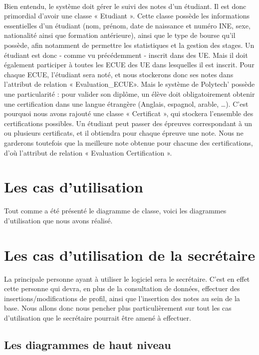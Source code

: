 \documentclass[letter, 11pt] {article}
\begin{document}
	\paragraph{ }	Bien entendu, le système doit gérer le suivi des notes d’un étudiant. Il est donc primordial d'avoir une classe « Etudiant ». Cette classe possède les informations essentielles d’un étudiant (nom, prénom, date de naissance et numéro INE, sexe, nationalité ainsi que formation antérieure), ainsi que le type de bourse qu’il possède, afin notamment de permettre les statistiques et la gestion des stages. Un étudiant est donc - comme vu précédemment - inscrit dans des UE. Mais il doit également participer à toutes les ECUE des UE dans lesquelles il est inscrit. Pour chaque ECUE, l’étudiant sera noté, et nous stockerons donc ses notes dans l'attribut de relation « Evaluation\_ECUE». Mais le système de Polytech’ possède une particularité : pour valider son diplôme, un élève doit obligatoirement obtenir une certification dans une langue étrangère (Anglais, espagnol, arable, …). C’est pourquoi nous avons rajouté une classe « Certificat », qui stockera l’ensemble des certifications possibles. Un étudiant peut passer des épreuves correspondant à un ou plusieurs certificats, et il obtiendra pour chaque épreuve une note. Nous ne garderons toutefois que la meilleure note obtenue pour chacune des certifications, d’où l’attribut de relation « Evaluation Certification ».
	
	\section{Les cas d'utilisation}
	
	Tout comme a été présenté le diagramme de classe, voici les diagrammes d'utilisation que nous avons réalisé.  
	
	\section{Les cas d'utilisation de la secrétaire}
	
	La principale personne ayant à utiliser le logiciel sera le secrétaire. C'est en effet cette personne qui devra, en plus de la consultation de données, effectuer des insertions/modifications de profil, ainsi que l'insertion des notes au sein de la base. Nous allons donc nous pencher plus particulièrement sur tout les cas d'utilisation que le secrétaire pourrait être amené à effectuer.

	\subsection{Les diagrammes de haut niveau}
	
\end{document}
